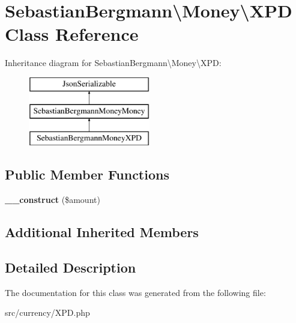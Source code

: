 \hypertarget{classSebastianBergmann_1_1Money_1_1XPD}{}\section{Sebastian\+Bergmann\textbackslash{}Money\textbackslash{}X\+P\+D Class Reference}
\label{classSebastianBergmann_1_1Money_1_1XPD}
Inheritance diagram for Sebastian\+Bergmann\textbackslash{}Money\textbackslash{}X\+P\+D\+:\begin{figure}[H]
\begin{center}
\leavevmode
\includegraphics[height=3.000000cm]{classSebastianBergmann_1_1Money_1_1XPD}
\end{center}
\end{figure}
\subsection*{Public Member Functions}
\begin{DoxyCompactItemize}
\item 
\hypertarget{classSebastianBergmann_1_1Money_1_1XPD_ac4af64458d425235f3f03dcb55bf3602}{}{\bfseries \+\_\+\+\_\+construct} (\$amount)\label{classSebastianBergmann_1_1Money_1_1XPD_ac4af64458d425235f3f03dcb55bf3602}

\end{DoxyCompactItemize}
\subsection*{Additional Inherited Members}


\subsection{Detailed Description}


The documentation for this class was generated from the following file\+:\begin{DoxyCompactItemize}
\item 
src/currency/X\+P\+D.\+php\end{DoxyCompactItemize}
